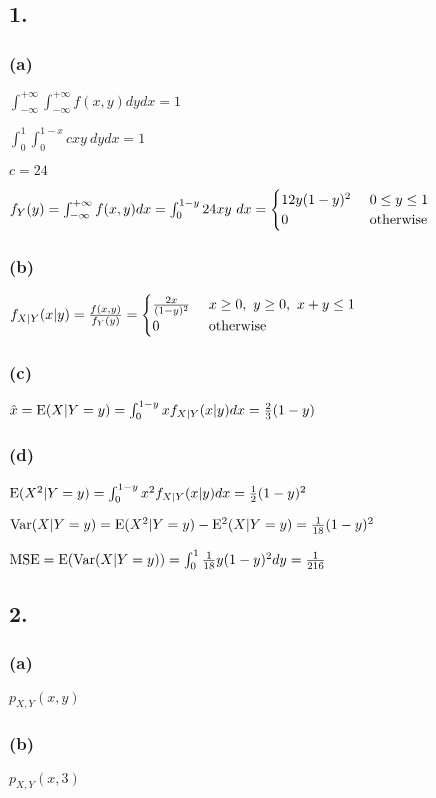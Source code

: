 \documentclass{article}
\begin{document}
\subsection*{1.}
\subsubsection*{(a)}
$\int _{-\infty }^{+\infty }\int _{-\infty }^{+\infty }f(x,y)dydx=1$\par
$\int _{0}^{1}\int _{0}^{1-x}cxy \ dydx=1$\par
$c=24$\par
$f_{Y}(y)=\int _{-\infty }^{+\infty }f(x,y)dx=\int _{0}^{1-y}24xy \ dx=\begin{cases}
12y(1-y)^{2} \ &0 \leq y \leq 1\\
0 \ &{\rm otherwise}
\end{cases}$
\subsubsection*{(b)}
$f_{X|Y}(x|y)=\frac{f(x,y)}{f_{Y}(y)}=\begin{cases}
\frac{2x}{(1-y)^{2}} \ &x\geq 0, \ y \geq 0, \ x+y \leq 1\\
0 \ &{\rm otherwise}
\end{cases}$
\subsubsection*{(c)}
$\hat{x}={\rm E}(X|Y=y)=\int_{0}^{1-y}xf_{X|Y}(x|y)dx=\frac{2}{3}(1-y)$
\subsubsection*{(d)}
${\rm E}(X^{2}|Y=y)=\int_{0}^{1-y}x^{2}f_{X|Y}(x|y)dx=\frac{1}{2}(1-y)^{2}$\par
${\rm Var}(X|Y=y)={\rm E}(X^{2}|Y=y)-{\rm E}^{2}(X|Y=y)=\frac{1}{18}(1-y)^{2}$\par
${\rm MSE}={\rm E}({\rm Var}(X|Y=y))=\int_{0}^{1}\frac{1}{18}y(1-y)^{2}dy=\frac{1}{216}$

\subsection*{2.}
\subsubsection*{(a)}
$p_{X,Y}(x,y)$
\subsubsection*{(b)}
$p_{X,Y}(x,3)$
\end{document}

